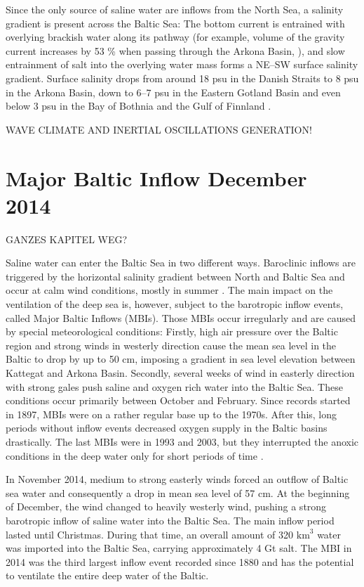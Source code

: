 Since the only source of saline water are inflows from the North Sea, a 
salinity gradient is present across the Baltic Sea: The bottom current is 
entrained with overlying brackish water along its pathway (for example, volume 
of the gravity current increases by 53 \% when passing through the Arkona Basin, 
\citep[see][]{reissmann2009}), and slow entrainment of salt into the overlying 
water mass forms a NE--SW surface salinity gradient. Surface salinity drops from 
around 18 psu in the Danish Straits to 8 psu in the Arkona Basin, down to 6--7 
psu in the Eastern Gotland Basin and even below 3 psu in the Bay of Bothnia and 
the Gulf of Finnland \citep[][]{balticsea}.

WAVE CLIMATE AND INERTIAL OSCILLATIONS GENERATION!

\section{Major Baltic Inflow December 2014}

GANZES KAPITEL WEG?

Saline water can enter the Baltic Sea in two different ways. Baroclinic inflows 
are triggered by the horizontal salinity gradient between North and Baltic Sea 
and occur at calm wind conditions, mostly in summer \citep[][]{reissmann2009}. 
The main impact on the ventilation of the deep sea is, however, subject to the 
barotropic inflow events, called Major Baltic Inflows (MBIs). Those MBIs occur 
irregularly and are caused by special meteorological conditions: Firstly, high 
air pressure over the Baltic region and strong winds in westerly direction cause 
the mean sea level in the Baltic to drop by up to 50 cm, imposing a gradient in 
sea level elevation between Kattegat and Arkona Basin. Secondly, several weeks 
of wind in easterly direction with strong gales \citep[][]{balticsea, 
reissmann2009, mohrholz2015} push saline and oxygen rich water into the Baltic 
Sea.
These conditions occur primarily between October and February. Since records 
started in 1897, MBIs were on a rather regular base up to the 1970s. After this, 
long periods without inflow events decreased oxygen supply in the Baltic basins 
drastically. The last MBIs were in 1993 and 2003, but they interrupted the 
anoxic conditions in the deep water only for short periods of time 
\citep[][]{schinke1998, mohrholz2015}.

In November 2014, medium to strong easterly winds forced an outflow of Baltic 
sea water and consequently a drop in mean sea level of 57 cm. At the beginning 
of December, the wind changed to heavily westerly wind, pushing a strong 
barotropic inflow of saline water into the Baltic Sea. The main inflow period 
lasted until Christmas. During that time, an overall amount of 320 $\text{km}^3$ 
water was imported into the Baltic Sea, carrying approximately 4 Gt salt. The 
MBI in 2014 was the third largest inflow event recorded since 1880 and has the 
potential to ventilate the entire deep water of the Baltic. 

